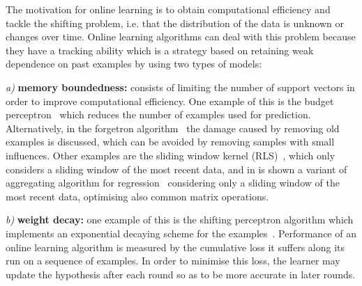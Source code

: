 The motivation for online learning is to obtain computational efficiency and tackle the shifting problem, i.e. that the distribution of the data is unknown or changes over time. Online learning algorithms can deal with this problem because they have a tracking ability which is a strategy based on retaining weak dependence on past examples by using two types of models: 

\textit{a)} \textbf{memory boundedness:} consists of limiting the number of support vectors in order to improve computational efficiency. One example of this is the budget perceptron~\cite{crammeretal2004} which reduces the number of examples used for prediction. Alternatively, in the forgetron algorithm~\cite{dekeletal2008} the damage caused by removing old examples is discussed, which can be avoided by removing samples with small influences. Other examples are the sliding window kernel (RLS)~\cite{vanvaerenberghetal2006}, which only considers a sliding window of the most recent data, and in \cite{arce+salinas2012} is shown a variant of aggregating algorithm for regression~\cite{vovk2001} considering only a sliding window of the most recent data, optimising also common matrix operations.

\textit{b)} \textbf{weight decay:} one example of this is the shifting perceptron algorithm which implements an exponential decaying scheme for the examples~\cite{cavallantietal2007}.
Performance of an online learning algorithm is measured by the cumulative loss it suffers along its run on a sequence of examples. In order to minimise this loss, the learner may update the hypothesis after each round so as to be more accurate in later rounds.

